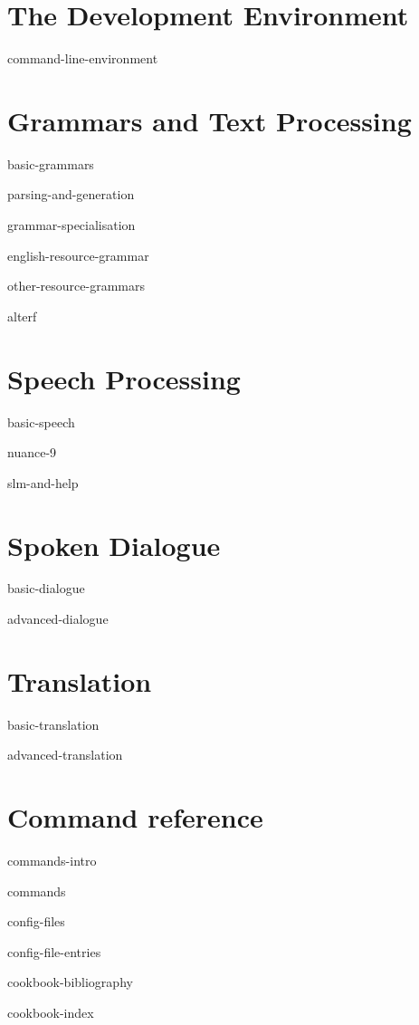 \documentclass{book}
\begin{document}
\part{The Development Environment}

 {command-line-environment}

\part{Grammars and Text Processing}
 
 {basic-grammars}

 {parsing-and-generation}

 {grammar-specialisation}

 {english-resource-grammar}

 {other-resource-grammars}

 {alterf}
  
\part{Speech Processing}

 {basic-speech}

 {nuance-9}

 {slm-and-help}


\part{Spoken Dialogue}
 
 {basic-dialogue}

 {advanced-dialogue}

\part{Translation}
 
 {basic-translation}

 {advanced-translation}

\part{Command reference}

 {commands-intro}

 {commands}
 
 {config-files}

 {config-file-entries}
 
\backmatter       %

 {cookbook-bibliography}
 
 {cookbook-index}
\end{document}
